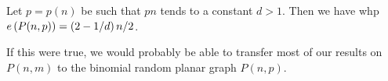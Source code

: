 \begin{conjecture}\label{con:pnp}
Let $p=p(n)$ be such that $pn$ tends to a constant $d>1$. Then we have whp $e\left({P(n,p)}\right)=\left(2-1/d\right)n/2$.
\end{conjecture}

If this were true, we would probably be able to transfer most of our results on $P(n,m)$ to the binomial random planar graph $P(n,p)$. 